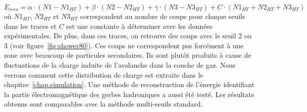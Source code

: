 \begin{equation}
  E_{reco}=\alpha\cdot (N1-N1_{HT})+\beta\cdot (N2-N2_{HT})+\gamma\cdot (N3-N3_{HT}) + C\cdot(N1_{HT}+N2_{HT}+N3_{HT}) 
  \label{eq.erec_ht}
\end{equation}
où $N1_{HT}$, $N2_{HT}$ et $N3_{HT}$ correspondent au nombre de coups pour chaque seuils dans les traces et $C$ est une constante à déterminer avec les données expérimentales. De plus, dans ces traces, on retrouve des coups avec le seuil 2 ou 3 (voir figure~\ref{fig:shower80}). Ces coups ne correspondent pas forcément à une zone avec beaucoup de particules secondaires. Ils sont plutôt produits à cause de fluctuations de la charge induite de l'avalanche dans la couche de gaz. Nous verrons comment cette distribution de charge est extraite dans le chapitre~\ref{chap.simulation}. Une méthode de reconstruction de l'énergie identifiant la partie électromagnétique des gerbes hadroniques a aussi été testé. Les résultats obtenus sont comparables avec la méthode multi-seuils standard. 
